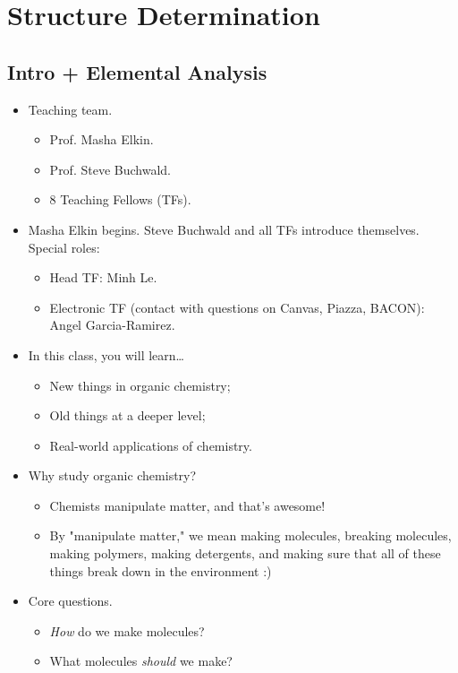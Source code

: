 \documentclass[../notes.tex]{subfiles}
\begin{document}
\chapter{Structure Determination}
\section{Intro + Elemental Analysis}
\begin{itemize}
    \item {}Teaching team.
    \begin{itemize}
        \item Prof. Masha Elkin.
        \item Prof. Steve Buchwald.
        \item 8 Teaching Fellows (TFs).
    \end{itemize}
    \item Masha Elkin begins. Steve Buchwald and all TFs introduce themselves. Special roles:
    \begin{itemize}
        \item Head TF: Minh Le.
        \item Electronic TF (contact with questions on Canvas, Piazza, BACON): Angel Garcia-Ramirez.
    \end{itemize}
    \item In this class, you will learn\dots
    \begin{itemize}
        \item New things in organic chemistry;
        \item Old things at a deeper level;
        \item Real-world applications of chemistry.
    \end{itemize}
    \item Why study organic chemistry?
    \begin{itemize}
        \item Chemists manipulate matter, and that's awesome!
        \item By "manipulate matter," we mean making molecules, breaking molecules, making polymers, making detergents, and making sure that all of these things break down in the environment :)
    \end{itemize}
    \item Core questions.
    \begin{itemize}
        \item \emph{How} do we make molecules?
        \item What molecules \emph{should} we make?

\end{itemize}
\end{itemize}
\end{document}
